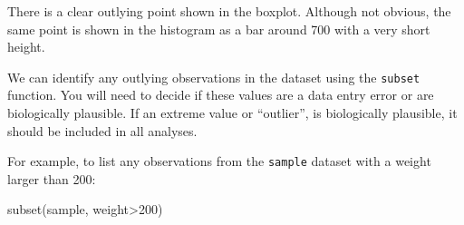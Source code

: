 \documentclass[
]{memoir}
\newenvironment{Shaded}{\begin{snugshade}}{\end{snugshade}}
\newcommand{\DecValTok}[1]{\textcolor[rgb]{0.00,0.00,0.81}{#1}}
\newcommand{\FunctionTok}[1]{\textcolor[rgb]{0.00,0.00,0.00}{#1}}
\newcommand{\NormalTok}[1]{#1}
\newcommand{\SpecialCharTok}[1]{\textcolor[rgb]{0.00,0.00,0.00}{#1}}
\begin{document}
There is a clear outlying point shown in the boxplot. Although not obvious, the same point is shown in the histogram as a bar around 700 with a very short height.

We can identify any outlying observations in the dataset using the \texttt{subset} function. You will need to decide if these values are a data entry error or are biologically plausible. If an extreme value or ``outlier'', is biologically plausible, it should be included in all analyses.

For example, to list any observations from the \texttt{sample} dataset with a weight larger than 200:

\begin{Shaded}
\begin{Highlighting}[]
\FunctionTok{subset}\NormalTok{(sample, weight}\SpecialCharTok{\textgreater{}}\DecValTok{200}\NormalTok{)}
\end{Highlighting}
\end{Shaded}

 
  \providecommand{\huxb}[2]{\arrayrulecolor[RGB]{#1}\global\arrayrulewidth=#2pt}
  \providecommand{\huxvb}[2]{\color[RGB]{#1}\vrule width #2pt}
  \providecommand{\huxtpad}[1]{\rule{0pt}{#1}}
  \providecommand{\huxbpad}[1]{\rule[-#1]{0pt}{#1}}
\end{document}
